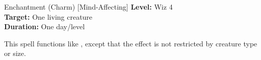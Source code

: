 {Enchantment (Charm) [Mind-Affecting]}
{
	\textbf{Level:}
	Wiz 4\\
	\textbf{Target:}
	One living creature\\
	\textbf{Duration:}
	One day/level\\
}
{
	This spell functions like , except that the effect is not restricted by creature type or size.

}
